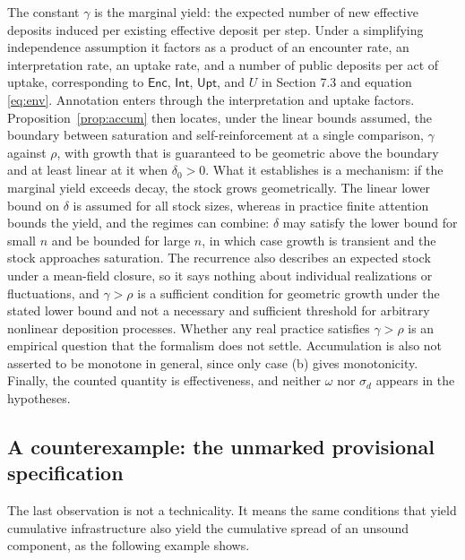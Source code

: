 \documentclass[11pt]{article}
\theoremstyle{definition}
\theoremstyle{remark}
\newcommand{\Enc}{\mathsf{Enc}}
\newcommand{\Int}{\mathsf{Int}}
\newcommand{\Upt}{\mathsf{Upt}}
\begin{document}
The constant $\gamma$ is the marginal yield: the expected number of new effective deposits induced per existing effective deposit per step. Under a simplifying independence assumption it factors as a product of an encounter rate, an interpretation rate, an uptake rate, and a number of public deposits per act of uptake, corresponding to $\Enc$, $\Int$, $\Upt$, and $U$ in Section 7.3 and equation \eqref{eq:env}. Annotation enters through the interpretation and uptake factors. Proposition~\ref{prop:accum} then locates, under the linear bounds assumed, the boundary between saturation and self-reinforcement at a single comparison, $\gamma$ against $\rho$, with growth that is guaranteed to be geometric above the boundary and at least linear at it when $\delta_0>0$. What it establishes is a mechanism: if the marginal yield exceeds decay, the stock grows geometrically. The linear lower bound on $\delta$ is assumed for all stock sizes, whereas in practice finite attention bounds the yield, and the regimes can combine: $\delta$ may satisfy the lower bound for small $n$ and be bounded for large $n$, in which case growth is transient and the stock approaches saturation. The recurrence also describes an expected stock under a mean-field closure, so it says nothing about individual realizations or fluctuations, and $\gamma>\rho$ is a sufficient condition for geometric growth under the stated lower bound and not a necessary and sufficient threshold for arbitrary nonlinear deposition processes. Whether any real practice satisfies $\gamma>\rho$ is an empirical question that the formalism does not settle. Accumulation is also not asserted to be monotone in general, since only case (b) gives monotonicity. Finally, the counted quantity is effectiveness, and neither $\omega$ nor $\sigma_d$ appears in the hypotheses.

\subsection{A counterexample: the unmarked provisional specification}\label{sec:harm}

The last observation is not a technicality. It means the same conditions that yield cumulative infrastructure also yield the cumulative spread of an unsound component, as the following example shows.
\end{document}
